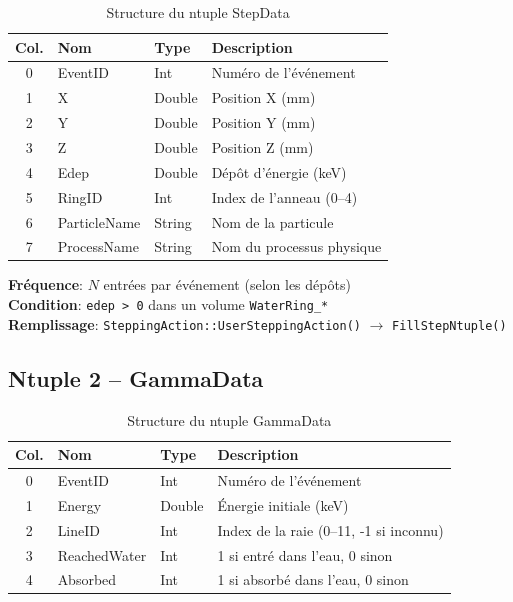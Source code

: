\documentclass[11pt,a4paper]{article}
\begin{document}
\begin{table}[h]
\centering
\begin{tabular}{clll}
\toprule
\rowcolor{headerblue!20}
\textbf{Col.} & \textbf{Nom} & \textbf{Type} & \textbf{Description} \\
\midrule
0 & EventID & Int & Numéro de l'événement \\
\rowcolor{lightgray}
1 & X & Double & Position X (mm) \\
2 & Y & Double & Position Y (mm) \\
\rowcolor{lightgray}
3 & Z & Double & Position Z (mm) \\
4 & Edep & Double & Dépôt d'énergie (keV) \\
\rowcolor{lightgray}
5 & RingID & Int & Index de l'anneau (0--4) \\
6 & ParticleName & String & Nom de la particule \\
\rowcolor{lightgray}
7 & ProcessName & String & Nom du processus physique \\
\bottomrule
\end{tabular}
\caption{Structure du ntuple StepData}
\end{table}

\textbf{Fréquence}: $N$ entrées par événement (selon les dépôts)\\
\textbf{Condition}: \texttt{edep > 0} dans un volume \texttt{WaterRing\_*}\\
\textbf{Remplissage}: \texttt{SteppingAction::UserSteppingAction()} $\rightarrow$ \texttt{FillStepNtuple()}

\subsection{Ntuple 2 -- GammaData}

\begin{table}[h]
\centering
\begin{tabular}{clll}
\toprule
\rowcolor{headerblue!20}
\textbf{Col.} & \textbf{Nom} & \textbf{Type} & \textbf{Description} \\
\midrule
0 & EventID & Int & Numéro de l'événement \\
\rowcolor{lightgray}
1 & Energy & Double & Énergie initiale (keV) \\
2 & LineID & Int & Index de la raie (0--11, -1 si inconnu) \\
\rowcolor{lightgray}
3 & ReachedWater & Int & 1 si entré dans l'eau, 0 sinon \\
4 & Absorbed & Int & 1 si absorbé dans l'eau, 0 sinon \\
\bottomrule
\end{tabular}
\caption{Structure du ntuple GammaData}
\end{table}
\end{document}
